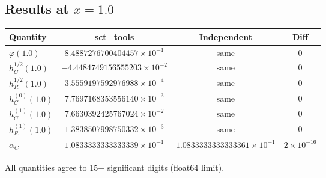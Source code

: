 \documentclass[12pt,a4paper]{article}
\theoremstyle{definition}
\theoremstyle{remark}
\begin{document}
\subsection{Results at $x = 1.0$}

\begin{center}
\renewcommand{\arraystretch}{1.3}
\begin{tabular}{lccc}
\toprule
\textbf{Quantity} & \textbf{sct\_tools} & \textbf{Independent} & \textbf{Diff} \\
\midrule
$\varphi(1.0)$ & $8.4887276700404457 \times 10^{-1}$ & same & $0$ \\
$h_C^{1/2}(1.0)$ & $-4.4484749156555203 \times 10^{-2}$ & same & $0$ \\
$h_R^{1/2}(1.0)$ & $3.5559197592976988 \times 10^{-4}$ & same & $0$ \\
$h_C^{(0)}(1.0)$ & $7.7697168353556140 \times 10^{-3}$ & same & $0$ \\
$h_C^{(1)}(1.0)$ & $7.6630392425767024 \times 10^{-2}$ & same & $0$ \\
$h_R^{(1)}(1.0)$ & $1.3838507998750332 \times 10^{-3}$ & same & $0$ \\
$\alpha_C$ & $1.0833333333333339 \times 10^{-1}$ & $1.0833333333333361 \times 10^{-1}$ & $2 \times 10^{-16}$ \\
\bottomrule
\end{tabular}
\end{center}

All quantities agree to 15+ significant digits (float64 limit).
\end{document}
